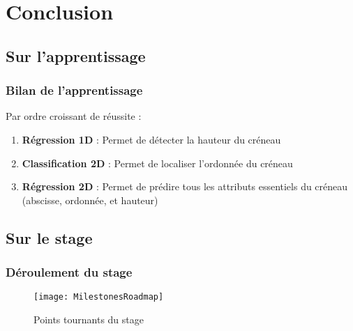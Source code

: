 
% 



\section{Conclusion}

\subsection{Sur l'apprentissage}
\begin{frame}
    \frametitle{Bilan de l'apprentissage}
    Par ordre croissant de réussite :
    \pause
    \begin{enumerate}[<+>]
        \item \textbf{Régression 1D} : Permet de détecter la hauteur du créneau %
        \item \textbf{Classification 2D} : Permet de localiser l'ordonnée du créneau %
        \item \textbf{Régression 2D} : Permet de prédire tous les attributs essentiels du créneau (abscisse, ordonnée, et hauteur)%
      \end{enumerate}
\end{frame}

\subsection{Sur le stage}
\begin{frame}
    \frametitle{Déroulement du stage}
    \begin{figure}
        \texttt{[image: MilestonesRoadmap]}       
        \caption{Points tournants du stage}
    \end{figure}
\end{frame}

